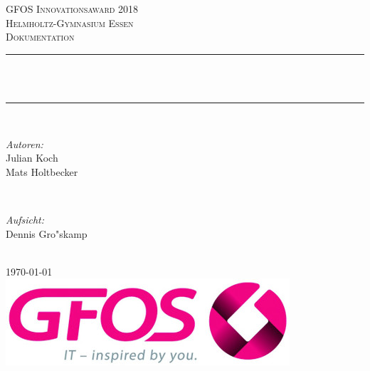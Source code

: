 \begin{titlepage}

    \newcommand{\HRule}{\rule{\linewidth}{0.5mm}} %

    \center %

    \textsc{\LARGE GFOS Innovationsaward 2018}\\[1.5cm]
    \textsc{\Large Helmholtz-Gymnasium Essen}\\[0.5cm]
    \textsc{\large Dokumentation}\\[0.5cm]

    \HRule \\[0.4cm]
    { \huge \bfseries \thetitle}\\[0.4cm]
    \HRule \\[1.5cm]

    \begin{minipage}{0.4\textwidth}
        \begin{flushleft}
            \large
            \emph{Autoren:}\\
            Julian Koch\\
            Mats Holtbecker
        \end{flushleft}
    \end{minipage}
    ~
    \begin{minipage}{0.4\textwidth}
        \begin{flushright}
            \large
            \emph{Aufsicht:} \\
            Dennis Gro"skamp\\
            \hfill
        \end{flushright}
    \end{minipage}\\[2cm]


    {\large \today}\\[2cm]

    \includegraphics[scale=0.7]{gfos_logo_edited.jpg}\\[1cm]


    \vfill

\end{titlepage}
